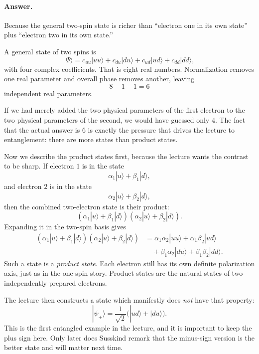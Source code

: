 \paragraph{Answer.} Because the general two-spin state is richer than ``electron one in its own state'' plus ``electron two in its own state.''

A general state of two spins is
\begin{equation}
|\Psi\rangle
=
c_{uu}|uu\rangle
+
c_{du}|du\rangle
+
c_{ud}|ud\rangle
+
c_{dd}|dd\rangle,
\end{equation}
with four complex coefficients. That is eight real numbers. Normalization removes one real parameter and overall phase removes another, leaving
\begin{equation}
8-1-1=6
\end{equation}
independent real parameters.

If we had merely added the two physical parameters of the first electron to the two physical parameters of the second, we would have guessed only \(4\). The fact that the actual answer is \(6\) is exactly the pressure that drives the lecture to entanglement: there are more states than product states.

Now we describe the product states first, because the lecture wants the contrast to be sharp. If electron \(1\) is in the state
\begin{equation}
\alpha_1|u\rangle+\beta_1|d\rangle,
\end{equation}
and electron \(2\) is in the state
\begin{equation}
\alpha_2|u\rangle+\beta_2|d\rangle,
\end{equation}
then the combined two-electron state is their product:
\begin{equation}
(\alpha_1|u\rangle+\beta_1|d\rangle)(\alpha_2|u\rangle+\beta_2|d\rangle).
\end{equation}
Expanding it in the two-spin basis gives
\begin{align}
(\alpha_1|u\rangle+\beta_1|d\rangle)(\alpha_2|u\rangle+\beta_2|d\rangle)
&=
\alpha_1\alpha_2|uu\rangle
+
\alpha_1\beta_2|ud\rangle \\
&\quad
+
\beta_1\alpha_2|du\rangle
+
\beta_1\beta_2|dd\rangle.
\end{align}
Such a state is a \emph{product state}. Each electron still has its own definite polarization axis, just as in the one-spin story. Product states are the natural states of two independently prepared electrons.

The lecture then constructs a state which manifestly does \emph{not} have that property:
\begin{equation}
|\psi_+\rangle
=
\frac{1}{\sqrt2}\bigl(|ud\rangle+|du\rangle\bigr).
\end{equation}
This is the first entangled example in the lecture, and it is important to keep the plus sign here. Only later does Susskind remark that the minus-sign version is the better state and will matter next time.

